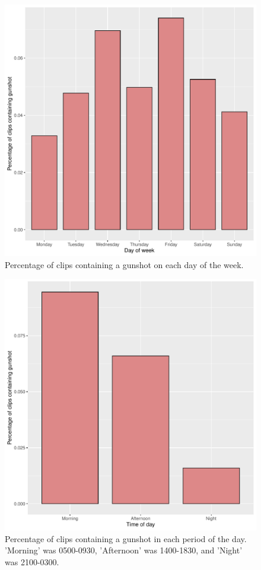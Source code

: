 \begin{figure}
\includegraphics[width=1.2\textwidth,center]{Figures/weekday_plot}\caption[Gunshot frequency by day of week barplot]{Percentage of clips containing a gunshot on each day of the week.}\label{fig:weekday_plot}
\end{figure}

\begin{figure}
\includegraphics[width=1.2\textwidth,center]{Figures/timeday_plot}\caption[Gunshot frequency by time of day]{Percentage of clips containing a gunshot in each period of the day. 'Morning' was 0500-0930, 'Afternoon' was 1400-1830, and 'Night' was 2100-0300.}\label{fig:timeday_plot}
\end{figure}



